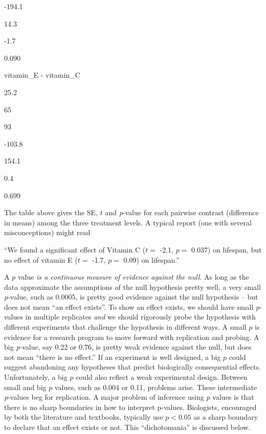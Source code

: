 \documentclass[]{book}
\begin{document}
-194.1

14.3

-1.7

0.090

vitamin\_E - vitamin\_C

25.2

65

93

-103.8

154.1

0.4

0.699

The table above gives the SE, \(t\) and \emph{p}-value for each pairwise contrast (difference in means) among the three treatment levels. A typical report (one with several misconceptions) might read

``We found a significant effect of Vitamin C (\(t=\) -2.1, \(p=\) 0.037) on lifespan, but no effect of vitamin E (\(t=\) -1.7, \(p=\) 0.09) on lifespan.''

A \(p\) value \emph{is a continuous measure of evidence against the null}. As long as the data approximate the assumptions of the null hypothesis pretty well, a very small \emph{p}-value, such as 0.0005, is pretty good evidence against the null hypothesis -- but does not mean ``an effect exists''. To show an effect exists, we should have small \emph{p}-values in multiple replicates \emph{and} we should rigorously probe the hypothesis with different experiments that challenge the hypothesis in different ways. A small \(p\) is evidence for a research program to move forward with replication and probing. A big \emph{p}-value, say 0.22 or 0.76, is pretty weak evidence against the null, but does not mean ``there is no effect.'' If an experiment is well designed, a big \(p\) could suggest abandoning any hypotheses that predict biologically consequential effects. Unfortunately, a big \(p\) could also reflect a weak experimental design. Between small and big \(p\) values, such as 0.004 or 0.11, problems arise. These intermediate \emph{p}-values beg for replication. A major problem of inference using \(p\) values is that there is no sharp boundaries in how to interpret p-values. Biologists, encouraged by both the literature and textbooks, typically use \(p < 0.05\) as a sharp boundary to declare that an effect exists or not. This ``dichotomania'' is discussed below.
\end{document}
